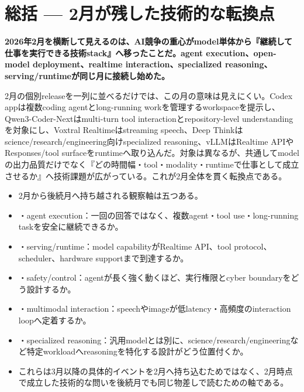\section{総括 — 2月が残した技術的な転換点}
\label{pkg:closing-synthesis}
\noindent\textbf{2026年2月を横断して見えるのは、AI競争の重心がmodel単体から『継続して仕事を実行できる技術stack』へ移ったことだ。agent execution、open-model deployment、realtime interaction、specialized reasoning、serving/runtimeが同じ月に接続し始めた。}\autocite{src-15823ae5556e,src-5041feb6f87f,src-d8b7c1c36830,src-dd5d9b8662f3,src-eac8dfbeb78c}

2月の個別releaseを一列に並べるだけでは、この月の意味は見えにくい。Codex appは複数coding agentとlong-running workを管理するworkspaceを提示し、Qwen3-Coder-Nextはmulti-turn tool interactionとrepository-level understandingを対象にし、Voxtral Realtimeはstreaming speech、Deep Thinkはscience/research/engineering向けspecialized reasoning、vLLMはRealtime APIやResponses/tool surfaceをruntimeへ取り込んだ。対象は異なるが、共通してmodelの出力品質だけでなく『どの時間幅・tool・modality・runtimeで仕事として成立させるか』へ技術課題が広がっている。これが2月全体を貫く転換点である。\autocite{src-15823ae5556e,src-5041feb6f87f,src-d8b7c1c36830,src-dd5d9b8662f3,src-eac8dfbeb78c}


\begin{itemize}
  \item 2月から後続月へ持ち越される観察軸は五つある。
  \item ・agent execution：一回の回答ではなく、複数agent・tool use・long-running taskを安全に継続できるか。
  \item ・serving/runtime：model capabilityがRealtime API、tool protocol、scheduler、hardware supportまで到達するか。
  \item ・safety/control：agentが長く強く動くほど、実行権限とcyber boundaryをどう設計するか。
  \item ・multimodal interaction：speechやimageが低latency・高頻度のinteraction loopへ定着するか。
  \item ・specialized reasoning：汎用modelとは別に、science/research/engineeringなど特定workloadへreasoningを特化する設計がどう位置付くか。
  \item これらは3月以降の具体的イベントを2月へ持ち込むためではなく、2月時点で成立した技術的な問いを後続月でも同じ物差しで読むための軸である。
\end{itemize}
\autocite{src-15823ae5556e,src-4a841ea7ec7c,src-5041feb6f87f,src-9aba7995b6a5,src-d8b7c1c36830,src-dd5d9b8662f3,src-dd64fe3084a4}

